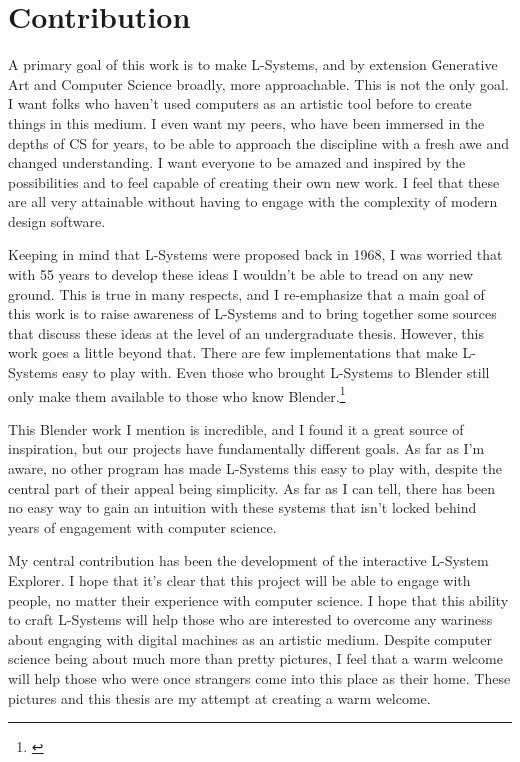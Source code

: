 \documentclass[12pt,twoside]{reedthesis}
\begin{document}
\chapter{Contribution}
	A primary goal of this work is to make L-Systems, and by extension Generative Art and Computer Science broadly, more approachable. This is not the only goal. I want folks who haven't used computers as an artistic tool before to create things in this medium. I even want my peers, who have been immersed in the depths of CS for years, to be able to approach the discipline with a fresh awe and changed understanding. I want everyone to be amazed and inspired by the possibilities and to feel capable of creating their own new work.  I feel that these are all very attainable without having to engage with the complexity of modern design software.
	
	Keeping in mind that L-Systems were proposed back in 1968, I was worried that with 55 years to develop these ideas I wouldn't be able to tread on any new ground. This is true in many respects, and I re-emphasize that a main goal of this work is to raise awareness of L-Systems and to bring together some sources that discuss these ideas at the level of an undergraduate thesis. However, this work goes a little beyond that. There are few implementations that make L-Systems easy to play with. Even those who brought L-Systems to Blender still only make them available to those who know Blender.\footnote{\cite{Leopold2017}}
	
	This Blender work I mention is incredible, and I found it a great source of inspiration, but our projects have fundamentally different goals. As far as I'm aware, no other program has made L-Systems this easy to play with, despite the central part of their appeal being simplicity. As far as I can tell, there has been no easy way to gain an intuition with these systems that isn't locked behind years of engagement with computer science.
	
	
	My central contribution has been the development of the interactive L-System Explorer. I hope that it's clear that this project will be able to engage with people, no matter their experience with computer science. I hope that this ability to craft L-Systems will help those who are interested to overcome any wariness about engaging with digital machines as an artistic medium. Despite computer science being about much more than pretty pictures, I feel that a warm welcome will help those who were once strangers come into this place as their home. These pictures and this thesis are my attempt at creating a warm welcome.
\end{document}
